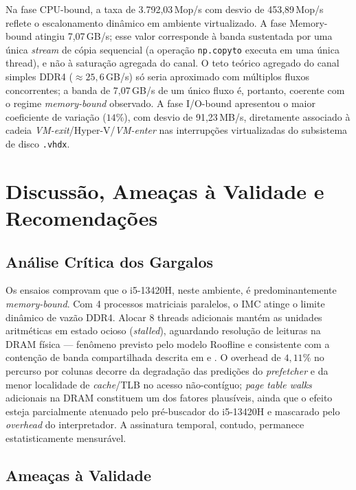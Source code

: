 \documentclass[
	12pt,
	openright,
	oneside,
	a4paper,
	english,
	brazil
	]{abntex2}
\begin{document}
Na fase CPU-bound, a taxa de 3.792,03\,Mop/s com desvio de 453,89\,Mop/s reflete o escalonamento dinâmico em ambiente virtualizado. A fase Memory-bound atingiu 7,07\,GB/s; esse valor corresponde à banda sustentada por uma única \textit{stream} de cópia sequencial (a operação \texttt{np.copyto} executa em uma única thread), e não à saturação agregada do canal. O teto teórico agregado do canal simples DDR4 ($\approx 25{,}6$\,GB/s) só seria aproximado com múltiplos fluxos concorrentes; a banda de 7,07\,GB/s de um único fluxo é, portanto, coerente com o regime \textit{memory-bound} observado. A fase I/O-bound apresentou o maior coeficiente de variação ($14\%$), com desvio de 91,23\,MB/s, diretamente associado à cadeia \textit{VM-exit}/Hyper-V/\textit{VM-enter} nas interrupções virtualizadas do subsistema de disco \texttt{.vhdx}.

\chapter{Discussão, Ameaças à Validade e Recomendações}
\label{chap:discussao}

\section{Análise Crítica dos Gargalos}
\label{sec:analise_critica}

Os ensaios comprovam que o i5-13420H, neste ambiente, é predominantemente \textit{memory-bound}. Com 4 processos matriciais paralelos, o IMC atinge o limite dinâmico de vazão DDR4. Alocar 8 threads adicionais mantém as unidades aritméticas em estado ocioso (\textit{stalled}), aguardando resolução de leituras na DRAM física — fenômeno previsto pelo modelo Roofline \cite{williams2009} e consistente com a contenção de banda compartilhada descrita em  e . O overhead de $4{,}11\%$ no percurso por colunas decorre da degradação das predições do \textit{prefetcher} e da menor localidade de \textit{cache}/TLB no acesso não-contíguo; \textit{page table walks} adicionais na DRAM constituem um dos fatores plausíveis, ainda que o efeito esteja parcialmente atenuado pelo pré-buscador do i5-13420H e mascarado pelo \textit{overhead} do interpretador. A assinatura temporal, contudo, permanece estatisticamente mensurável.

\section{Ameaças à Validade}
\label{sec:ameacas}
\end{document}

